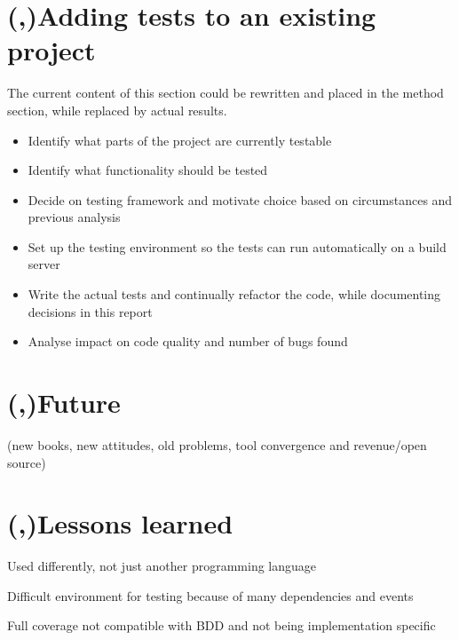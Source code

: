 \documentclass[11pt]{article}
\begin{document}
\section{(,)Adding tests to an existing project}

The current content of this section could be rewritten and placed in the method section, while replaced by actual results.

\begin{itemize}
  \item Identify what parts of the project are currently testable
  \item Identify what functionality should be tested
  \item Decide on testing framework and motivate choice based on circumstances and previous analysis
  \item Set up the testing environment so the tests can run automatically on a build server
  \item Write the actual tests and continually refactor the code, while documenting decisions in this report
  \item Analyse impact on code quality and number of bugs found
\end{itemize}


\section{(,)Future}

(new books, new attitudes, old problems, tool convergence and revenue/open source)

\section{(,)Lessons learned}

Used differently, not just another programming language

Difficult environment for testing because of many dependencies and events

Full coverage not compatible with BDD and not being implementation specific

\printbibliography
\end{document}
